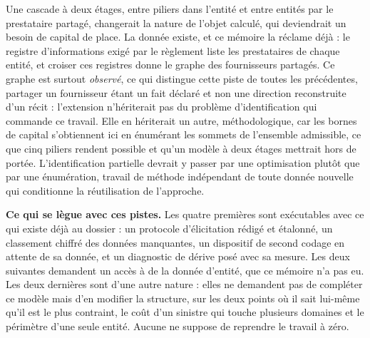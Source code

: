 Une cascade à deux étages, entre piliers dans l'entité et entre entités par le prestataire partagé,
changerait la nature de l'objet calculé, qui deviendrait un besoin de capital de place. La donnée
existe, et ce mémoire la réclame déjà : le registre d'informations exigé par le règlement liste les
prestataires de chaque entité, et croiser ces registres donne le graphe des fournisseurs partagés.
Ce graphe est surtout \emph{observé}, ce qui distingue cette piste de toutes les précédentes,
partager un fournisseur étant un fait déclaré et non une direction reconstruite d'un récit :
l'extension n'hériterait pas du problème d'identification qui commande ce travail. Elle en
hériterait un autre, méthodologique, car les bornes de capital s'obtiennent ici en énumérant les
sommets de l'ensemble admissible, ce que cinq piliers rendent possible et qu'un modèle à deux
étages mettrait hors de portée. L'identification partielle devrait y passer par une optimisation
plutôt que par une énumération, travail de méthode indépendant de toute donnée nouvelle qui
conditionne la réutilisation de l'approche.

\begin{cle}
\textbf{Ce qui se lègue avec ces pistes.} Les quatre premières sont exécutables avec ce qui existe
déjà au dossier : un protocole d'élicitation rédigé et étalonné, un classement chiffré des données
manquantes, un dispositif de second codage en attente de sa donnée, et un diagnostic de dérive posé
avec sa mesure. Les deux suivantes demandent un accès à de la donnée d'entité, que ce mémoire n'a
pas eu. Les deux dernières sont d'une autre nature : elles ne demandent pas de compléter ce modèle
mais d'en modifier la structure, sur les deux points où il sait lui-même qu'il est le plus
contraint, le coût d'un sinistre qui touche plusieurs domaines et le périmètre d'une seule entité.
Aucune ne suppose de reprendre le travail à zéro.
\end{cle}

